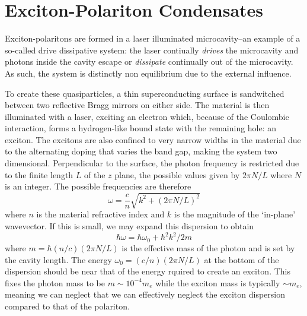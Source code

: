 \section{Exciton-Polariton Condensates}

Exciton-polaritons are formed in a laser illuminated microcavity--an example of a so-called drive dissipative system: the laser contiually \emph{drives} the microcavity and photons inside the cavity escape or 
\emph{dissipate} continually out of the microcavity. As such, the system is distinctly non equilibrium due to the external influence. 

To create these quasiparticles, a thin superconducting surface is sandwitched between two reflective Bragg mirrors on either side. The material is then illuminated with a laser, exciting an electron which, because of the Coulombic interaction, forms a hydrogen-like bound state with the remaining hole: an exciton. The excitons are also confined to very narrow widths in the material due to the alternating doping that varies the band gap, making the system two dimensional. Perpendicular to the surface, the photon frequency is restricted due to the finite length $L$ of the $z$ plane, the possible values given by $2\pi N/L$ where $N$ is an integer. The possible frequencies are therefore 
\[
\omega = \frac{c}{n}\sqrt{k^2 + (2\pi N/L)^2} 
\]
where $n$ is the material refractive index and $k$ is the magnitude of the `in-plane' wavevector. If this is small, we may expand this dispersion to obtain
\[
\hbar \omega = \hbar \omega_0 + \hbar^2k^2/2m 
\]
where $m = \hbar(n/c)(2 \pi N /L)$ is the effective mass of the photon and is set by the cavity length. The energy  $\omega_0 = (c/n)(2 \pi N / L)$ at the bottom of the dispersion should be near that of the energy rquired to create an exciton. This fixes the photon mass to be $m \sim 10^{-4}m_e$ while the exciton mass is typically $\sim m_e$, meaning we can neglect that we can effectively neglect the exciton dispersion compared to that of the polariton. 

